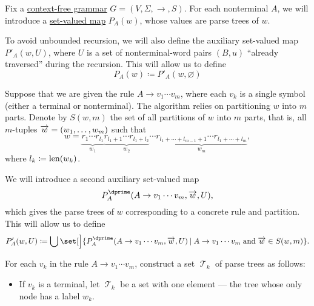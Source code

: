 \begin{algorithm}\label{alg:brute_force_parsing}
  Fix a \hyperref[def:chomsky_hierarchy/context_free]{context-free grammar} \( G = (V, \Sigma, \to, S) \). For each nonterminal \( A \), we will introduce a \hyperref[def:function]{set-valued map} \( P_A(w) \), whose values are parse trees of \( w \).

  To avoid unbounded recursion, we will also define the auxiliary set-valued map \( P'_A(w, U) \), where \( U \) is a set of nonterminal-word pairs \( (B, u) \) \enquote{already traversed} during the recursion. This will allow us to define
  \begin{equation*}
    P_A(w)
    \coloneqq
    P'_A(w, \varnothing)
  \end{equation*}

  Suppose that we are given the rule \( A \to v_1 \cdots v_m \), where each \( v_k \) is a single symbol (either a terminal or nonterminal). The algorithm relies on partitioning \( w \) into \( m \) parts. Denote by \( S(w, m) \) the set of all partitions of \( w \) into \( m \) parts, that is, all \( m \)-tuples \( \overrightarrow{w} = (w_1, \ldots, w_m) \) such that
  \begin{equation*}
    w = \underbrace{ r_1 \cdots r_{l_1} }_{w_1} \underbrace{ r_{l_1 + 1} \cdots r_{l_1 + l_2} }_{w_2} \cdots \underbrace{ r_{l_1 + \cdots + l_{m-1} + 1} \cdots r_{l_1 + \cdots + l_m} }_{w_m},
  \end{equation*}
  where \( l_k \coloneqq \operatorname{len}(w_k) \).

  We will introduce a second auxiliary set-valued map
  \begin{equation*}
    P^\dprime_A(A \to v_1 \cdots v_m, \vect w, U),
  \end{equation*}
  which gives the parse trees of \( w \) corresponding to a concrete rule and partition. This will allow us to define
  \begin{equation*}
    P'_A(w, U)
    \coloneqq
    \bigcup\set[\Big]{ P^\dprime_A(A \to v_1 \cdots v_m, \vect w, U) \given A \to v_1 \cdots v_m \T{and} \vect w \in S(w, m) }.
  \end{equation*}

  \begin{thmenum}
     For each \( v_k \) in the rule \( A \to v_1 \cdots v_m \), construct a set \( \mscrT_k \) of parse trees as follows:
    \begin{itemize}
      \item If \( v_k \) is a terminal, let \( \mscrT_k \) be a set with one element --- the tree whose only node has a label \( w_k \).


\end{itemize}
\end{thmenum}
\end{algorithm}
